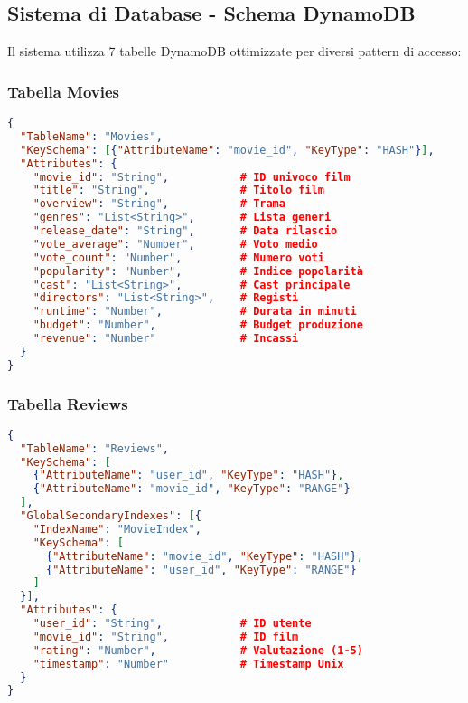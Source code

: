 \documentclass[11pt,a4paper]{article}
\begin{document}
\subsection{Sistema di Database - Schema DynamoDB}

Il sistema utilizza 7 tabelle DynamoDB ottimizzate per diversi pattern di accesso:

\subsubsection{Tabella Movies}
\begin{lstlisting}[language=JSON, caption=Schema Tabella Movies]
{
  "TableName": "Movies",
  "KeySchema": [{"AttributeName": "movie_id", "KeyType": "HASH"}],
  "Attributes": {
    "movie_id": "String",           # ID univoco film
    "title": "String",              # Titolo film
    "overview": "String",           # Trama
    "genres": "List<String>",       # Lista generi
    "release_date": "String",       # Data rilascio
    "vote_average": "Number",       # Voto medio
    "vote_count": "Number",         # Numero voti
    "popularity": "Number",         # Indice popolarità
    "cast": "List<String>",         # Cast principale
    "directors": "List<String>",    # Registi
    "runtime": "Number",            # Durata in minuti
    "budget": "Number",             # Budget produzione
    "revenue": "Number"             # Incassi
  }
}
\end{lstlisting}

\subsubsection{Tabella Reviews}
\begin{lstlisting}[language=JSON, caption=Schema Tabella Reviews]
{
  "TableName": "Reviews",
  "KeySchema": [
    {"AttributeName": "user_id", "KeyType": "HASH"},
    {"AttributeName": "movie_id", "KeyType": "RANGE"}
  ],
  "GlobalSecondaryIndexes": [{
    "IndexName": "MovieIndex",
    "KeySchema": [
      {"AttributeName": "movie_id", "KeyType": "HASH"},
      {"AttributeName": "user_id", "KeyType": "RANGE"}
    ]
  }],
  "Attributes": {
    "user_id": "String",            # ID utente
    "movie_id": "String",           # ID film
    "rating": "Number",             # Valutazione (1-5)
    "timestamp": "Number"           # Timestamp Unix
  }
}
\end{lstlisting}
\end{document}
